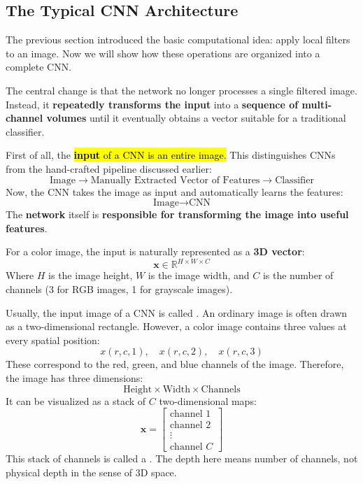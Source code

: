 \subsection{The Typical CNN Architecture}\label{sec:typical-cnn-architecture}

The previous section introduced the basic computational idea: apply local filters to an image. Now we will show how these operations are organized into a complete CNN.

\highspace
The central change is that the network no longer processes a single filtered image. Instead, it \textbf{repeatedly transforms the input} into a \textbf{sequence of multi-channel volumes} until it eventually obtains a vector suitable for a traditional classifier.

\highspace
First of all, the \hl{\textbf{input} of a CNN is an entire image.} This distinguishes CNNs from the hand-crafted pipeline discussed earlier:
\begin{equation*}
    \text{Image} \to \text{Manually Extracted Vector of Features} \to \text{Classifier}
\end{equation*}
Now, the CNN takes the image as input and automatically learns the features:
\begin{equation*}
    \text{Image} \to \text{CNN}
\end{equation*}
The \textbf{network} itself is \textbf{responsible for transforming the image into useful features}.

\highspace
For a color image, the input is naturally represented as a \textbf{3D vector}:
\begin{equation*}
    \mathbf{x} \in \mathbb{R}^{H \times W \times C}
\end{equation*}
Where $H$ is the image height, $W$ is the image width, and $C$ is the number of channels (3 for RGB images, 1 for grayscale images).

\highspace
Usually, the input image of a CNN is called . An ordinary image is often drawn as a two-dimensional rectangle. However, a color image contains three values at every spatial position:
\begin{equation*}
    x(r, c, 1), \quad x(r, c, 2), \quad x(r, c, 3)
\end{equation*}
These correspond to the red, green, and blue channels of the image. Therefore, the image has three dimensions:
\begin{equation*}
    \text{Height} \times \text{Width} \times \text{Channels}
\end{equation*}
It can be visualized as a stack of $C$ two-dimensional maps:
\begin{equation*}
    \mathbf{x} = \begin{bmatrix}
        \text{channel }1 \\
        \text{channel }2 \\
        \vdots \\
        \text{channel }C
    \end{bmatrix}
\end{equation*}
This stack of channels is called a . The depth here means number of channels, not physical depth in the sense of 3D space.

